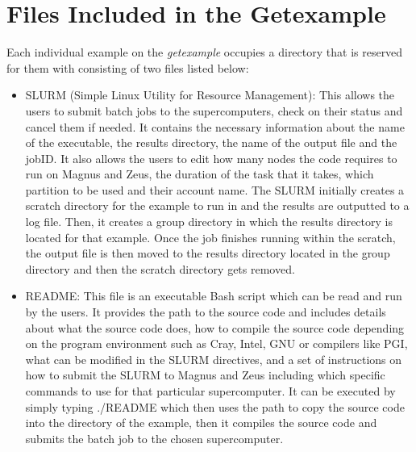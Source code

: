 \section{ Files Included in the Getexample}

Each individual example on the \emph{getexample} occupies a directory that is reserved for them with consisting of two files listed below:

\begin{itemize}
\item SLURM (Simple Linux Utility for Resource Management): This allows the users to submit batch jobs to the supercomputers, check on their status and
cancel them if needed. It contains the necessary information about the name of the executable, the results directory, the name of the output file and
the jobID. It also allows the users to edit how many nodes the code requires to run on Magnus and Zeus, the duration of the task that it takes, which
partition to be used and their account name. The SLURM initially creates a scratch directory for the example to run in and the results are outputted to
a log file. Then, it creates a group directory in which the results directory is located for that example. Once the job finishes running within the
scratch, the output file is then moved to the results directory located in the group directory and then the scratch directory gets removed.
\item README: This file is an executable Bash script which can be read and run by the users. It provides the path to the source code and includes 
details about what the source code does, how to compile the source code depending on the program environment such as Cray, Intel, GNU or compilers like 
PGI, what can be modified in the SLURM directives, and a set of instructions on how to submit the SLURM to Magnus and Zeus including which specific 
commands to use for that particular supercomputer. It can be executed by simply typing ./README which then uses the path to copy the source code into the 
directory of the example, then it compiles the source code and submits the batch job to the chosen supercomputer.
\end{itemize}


